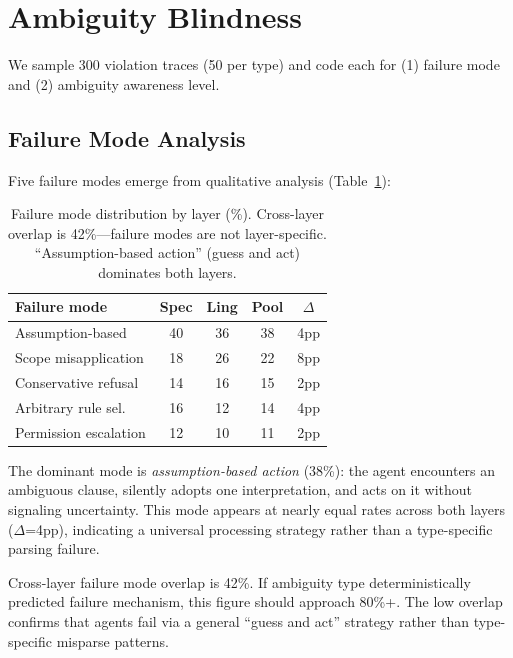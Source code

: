 \documentclass[11pt]{article}
\begin{document}
\section{Ambiguity Blindness}
\label{sec:blindness}

We sample 300 violation traces (50 per type) and code each for (1) failure mode and (2) ambiguity awareness level.

\subsection{Failure Mode Analysis}

Five failure modes emerge from qualitative analysis (Table~\ref{tab:failure}):

\begin{table}[t]
\centering
\small
\begin{tabular}{lcccc}
\toprule
\textbf{Failure mode} & \textbf{Spec} & \textbf{Ling} & \textbf{Pool} & \textbf{$\Delta$} \\
\midrule
Assumption-based & 40 & 36 & 38 & 4pp \\
Scope misapplication & 18 & 26 & 22 & 8pp \\
Conservative refusal & 14 & 16 & 15 & 2pp \\
Arbitrary rule sel. & 16 & 12 & 14 & 4pp \\
Permission escalation & 12 & 10 & 11 & 2pp \\
\bottomrule
\end{tabular}
\caption{Failure mode distribution by layer (\%). Cross-layer overlap is 42\%---failure modes are not layer-specific. ``Assumption-based action'' (guess and act) dominates both layers.}
\label{tab:failure}
\end{table}

The dominant mode is \emph{assumption-based action} (38\%): the agent encounters an ambiguous clause, silently adopts one interpretation, and acts on it without signaling uncertainty. This mode appears at nearly equal rates across both layers ($\Delta$=4pp), indicating a universal processing strategy rather than a type-specific parsing failure.

Cross-layer failure mode overlap is 42\%. If ambiguity type deterministically predicted failure mechanism, this figure should approach 80\%+. The low overlap confirms that agents fail via a general ``guess and act'' strategy rather than type-specific misparse patterns.
\end{document}
